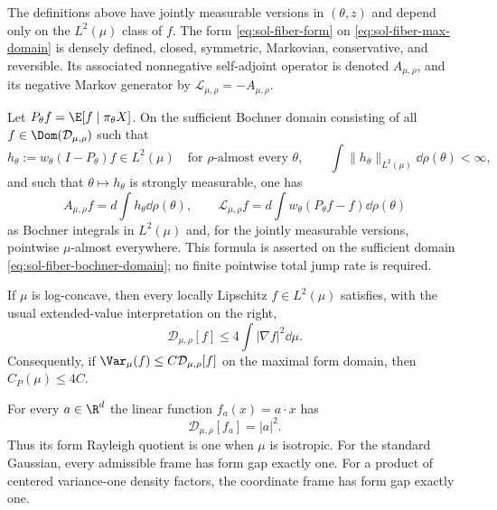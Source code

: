 \documentclass[../main.tex]{subfiles}
\begin{document}
\begin{theorem}
\label{thm:sol-conditional-fiber-form}
The definitions above have jointly measurable versions in $(\theta,z)$ and depend only on the
$L^2(\mu)$ class of $f$.  The form \eqref{eq:sol-fiber-form} on
\eqref{eq:sol-fiber-max-domain} is densely defined, closed, symmetric, Markovian, conservative,
and reversible.  Its associated nonnegative self-adjoint operator is denoted
$A_{\mu,\rho}$, and its negative Markov generator by
$\mathcal L_{\mu,\rho}=-A_{\mu,\rho}$.

Let $P_\theta f=\E[f\mid\pi_\theta X]$.  On the sufficient Bochner domain consisting of all
$f\in\Dom(\mathcal D_{\mu,\rho})$ such that
\begin{equation}
  h_\theta:=w_\theta(I-P_\theta)f\in L^2(\mu)
  \quad\text{for $\rho$-almost every $\theta$},
  \qquad
  \int\|h_\theta\|_{L^2(\mu)}\dd\rho(\theta)<\infty,
  \label{eq:sol-fiber-bochner-domain}
\end{equation}
and such that $\theta\mapsto h_\theta$ is strongly measurable, one has
\begin{equation}
  A_{\mu,\rho}f=d\int h_\theta\dd\rho(\theta),
  \qquad
  \mathcal L_{\mu,\rho}f
  =d\int w_\theta(P_\theta f-f)\dd\rho(\theta)
  \label{eq:sol-fiber-generator}
\end{equation}
as Bochner integrals in $L^2(\mu)$ and, for the jointly measurable versions, pointwise
$\mu$-almost everywhere.  This formula is asserted on the sufficient domain
\eqref{eq:sol-fiber-bochner-domain}; no finite pointwise total jump rate is required.

If $\mu$ is log-concave, then every locally Lipschitz $f\in L^2(\mu)$ satisfies, with the usual
extended-value interpretation on the right,
\begin{equation}
  \mathcal D_{\mu,\rho}[f]
  \le 4\int|\nabla f|^2\dd\mu.
  \label{eq:sol-fiber-gradient-comparison}
\end{equation}
Consequently, if
$\Var_\mu(f)\le C\mathcal D_{\mu,\rho}[f]$ on the maximal form domain, then
$C_P(\mu)\le4C$.

For every $a\in\R^d$ the linear function $f_a(x)=a\cdot x$ has
\begin{equation}
  \mathcal D_{\mu,\rho}[f_a]=|a|^2.
  \label{eq:sol-fiber-linear}
\end{equation}
Thus its form Rayleigh quotient is one when $\mu$ is isotropic.  For the standard Gaussian,
every admissible frame has form gap exactly one.  For a product of centered variance-one density
factors, the coordinate frame has form gap exactly one.
\end{theorem}
\end{document}
